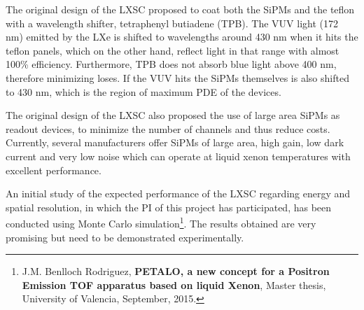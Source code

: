 The original design of the LXSC proposed to coat both the SiPMs and the teflon with a 
wavelength shifter, tetraphenyl butiadene (TPB). The VUV light (172 nm) emitted by the LXe is shifted to wavelengths around 430 nm when it hits the teflon panels, which on the other hand, reflect light in that range with almost 100\% efficiency. Furthermore, TPB does not absorb blue light above 400 nm, therefore minimizing loses. If the VUV hits the SiPMs themselves is also shifted to 430 nm, which is the region of maximum PDE of the devices. 

The original design of the LXSC also proposed the  
use of large area SiPMs as readout devices, to minimize the number of channels and thus reduce costs. Currently, several manufacturers offer SiPMs of large area, high gain, low dark current and very low noise which can operate at liquid xenon temperatures with excellent performance.

An initial study of the expected performance of the LXSC regarding energy and spatial resolution, in which the PI of this project has participated,  has been conducted using Monte Carlo simulation\footnote{J.M. Benlloch Rodriguez, {\bf PETALO, a new concept for a Positron Emission TOF apparatus based on liquid Xenon}, Master thesis, University of Valencia, September, 2015.}. The results obtained are very promising but need to be demonstrated experimentally. 
\\




